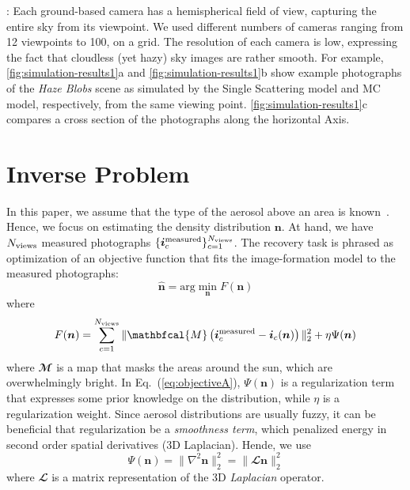 \documentclass[10pt,letterpaper]{article}
\newcommand{\Mask}{\mathbfcal{M}}
\newcommand{\Laplacian}{\mathbfcal{L}}
\newcommand{\argmin}{\mathrm{arg}\min}
\newcommand{\roundy}[1]{\left(#1\right)}
\newcommand{\vect}[1]{\bm{#1}}
\begin{document}
: Each ground-based camera has a hemispherical
field of view, capturing the entire sky from its viewpoint. We used
different numbers of cameras ranging from 12 viewpoints to 100, on a
grid.  The resolution of each camera is low, expressing the fact that
cloudless (yet hazy) sky images are rather smooth.  For example,
\cref{fig:simulation-results1}a and \cref{fig:simulation-results1}b
show example photographs of the {\em Haze Blobs} scene as simulated by
the Single Scattering model and MC model, respectively, from the same
viewing point.  \cref{fig:simulation-results1}c compares a cross
section of the photographs along the horizontal Axis.


\section{Inverse Problem}
\label{sec:inverse-problem}

In this paper, we assume that the type of the aerosol above an area is
known~\cite{Martonchik2009}. Hence, we focus on estimating the density
distribution ${\bm n}$.
At hand, we have $N_{\rm views}$ measured photographs $\{ {\bm i}^{\rm
  measured}_c\}_{c=1}^{N_{\rm views}}$. The recovery task is phrased
as optimization of an objective function that fits the image-formation
model to the measured photographs:
\begin{equation}
  \label{eq:minobjectiveA}
  \hat{\bm n} =
  \argmin_{{\bm n}} F({\bm n})
\end{equation}
where
\begin{equation}
  \label{eq:objectiveA}
  F({\bm n})
  = \sum_{c=1}^{N_{\rm views}}
  \| \Mask \roundy{{\bm i}^{\rm measured}_c - {\bm i}_c({\bm n})}\|^2_2
  + \eta \Psi({\bm n})
\end{equation}
where $\Mask$ is a map that masks the areas around the sun, which are
overwhelmingly bright. %
In Eq.~(\ref{eq:objectiveA}), $\Psi({\bm n})$ is a regularization term
that expresses some prior knowledge on the distribution, while $\eta$
is a regularization weight.  Since aerosol distributions are usually
fuzzy, it can be beneficial that regularization be a {\em smoothness
  term}, which penalized energy in second order spatial derivatives
(3D Laplacian). Hende, we use
\begin{equation}
  \label{eq:regularizer}
  \Psi({\bm n}) = \| \nabla^2{\bm n}\|^2_2 = \| \Laplacian{\bm n}\|^2_2
\end{equation}
where $\Laplacian$ is a matrix representation of the 3D
\emph{Laplacian} operator.
\end{document}
